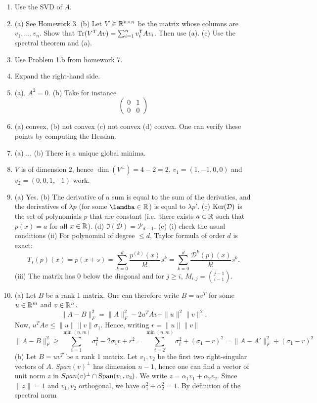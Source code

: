 \documentclass[11pt,nocut]{article}
\begin{document}
\begin{enumerate}
	\item Use the SVD of $A$.
	\item (a) See Homework 3. (b) Let $V \in \mathbb{R}^{n \times n}$ be the matrix whose columns are $v_1, \dots, v_n$. Show that ${{\rm Tr}}(V^T A v) = \sum_{i=1}^n v_i^{{\sf T}} A v_i$. Then use (a). (c) Use the spectral theorem and (a).
	\item Use Problem 1.b from homework 7.
	\item Expand the right-hand side.
	\item (a). $A^2 = 0$. (b) Take for instance
		$$
		\begin{pmatrix}
			0 & 1 \\
			0 & 0
		\end{pmatrix}
		$$
	\item (a) convex, (b) not convex (c) not convex (d) convex. One can verify these points by computing the Hessian.
	\item (a) ... (b) There is a unique global minima.
	\item $V$ is of dimension $2$, hence $\dim(V^{\perp}) = 4-2 = 2$. $v_1 = (1,-1,0,0)$ and $v_2 = (0, 0, 1,-1)$ work.
	\item (a) Yes. (b) The derivative of a sum is equal to the sum of the derivaties, and the derivatives of $\lambda p$ (for some $\lamdba \in \R$) is equal to $\lambda p'$.
		(c) ${{\rm Ker}}(\mathcal{D})$ is the set of polynomials $p$ that are constant (i.e.\ there exists $a\in\mathbb{R}$ such that $p(x) =a$ for all $x \in \mathbb{R}$).
		(d) $\Im(\mathcal{D}) = \mathcal{P}_{d-1}$.
		(e) (i) check the usual conditions (ii) For polynomial of degree $\leq d$, Taylor formula of order $d$ is exact:
		$$
		T_s(p)(x) = p(x+s) = \sum_{k=0}^d \frac{p^{(k)}(x)}{k!}s^k = \sum_{k=0}^d \frac{\mathcal{D}^k(p)(x)}{k!}s^k.
		$$
	(iii) The matrix has $0$ below the diagonal and for $j \geq i$, $M_{i,j} = \binom{j-1}{i-1}$.
\item (a) Let $B$ be a rank $1$ matrix. One can therefore write $B = u v^T$ for some $u \in \mathbb{R}^m$ and $v \in \mathbb{R}^n$.
	$$
	\|A-B\|_F^2 = \|A\|^2_F - 2 u^T A v + \|u\|^2 \|v\|^2.
	$$
	Now, $u^T Av \leq \|u\| \|v\| \sigma_1$. Hence, writing $r=\|u\|\|v\|$
	$$
	\|A-B\|_F^2 \geq \sum_{i=1}^{\min(n,m)} \sigma_i^2 - 2 \sigma_1 r + r^2
	= \sum_{i=2}^{\min(n,m)} \sigma_i^2 + (\sigma_1 -r)^2
	= \|A-A'\|_{F}^2 + (\sigma_1 - r)^2
	$$
	(b) Let $B = u v^T$ be a rank 1 matrix. Let $v_1, v_2$ be the first two right-singular vectors of $A$. $Span(v)^{\perp}$ has dimension $n-1$, hence one can find a vector of unit norm $z$ in $Span(v)^{\perp} \cap {{\rm Span}}(v_1,v_2)$. We write $z = \alpha_1 v_1 + \alpha_2 v_2$. Since $\|z\|=1$ and $v_1, v_2$ orthogonal, we have $\alpha_1^2 + \alpha_2^2 = 1$. By definition of the spectral norm

\end{enumerate}
\end{document}
